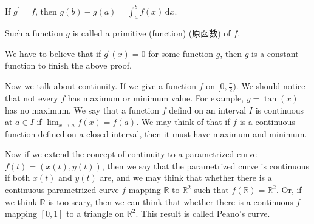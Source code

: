 \begin{theorem}
  If \(g^{\prime}  = f\), then \(g(b) - g(a) = \int _a^b f(x) \, \mathrm{d} x \).    
\end{theorem}

\begin{remark}
  Such a function \(g\) is called a primitive (function) (原函數) of \(f\).  
\end{remark}

\begin{remark}
  We have to believe that if \(g^{\prime} (x) = 0\) for some function \(g\), then \(g\) is a constant function to finish the above proof.   
\end{remark}

Now we talk about continuity. If we give a function \(f\) on \([0,\frac{\pi}{2})\). We should notice that not every \(f\) has maximum or minimum value. For example, \(y = \tan (x)\) has no maximum. We say that a function \(f\)  defind on an interval \(I\) is continuous at \(a \in I\) if \(\lim_{x \to a} f(x) = f(a) \). We may think of that if \(f\) is a continuous function defined on a closed interval, then it must have maximum and minimum.

Now if we extend the concept of continuity to a parametrized curve \(f(t)=(x(t),y(t))\), then we say that the parametrized curve is continuous if both \(x(t)\) and \(y(t)\) are, and we may think that whether there is a continuous parametrized curve \(f\)  mapping \(\mathbb{R}\) to \(\mathbb{R} ^2\) such that \(f(\mathbb{R} ) = \mathbb{R} ^2\).  Or, if we think \(\mathbb{R} \) is too scary, then we can think that whether there is a continuous \(f\) mapping \([0,1]\) to a triangle on \(\mathbb{R} ^2\). This result is called Peano's curve.           
